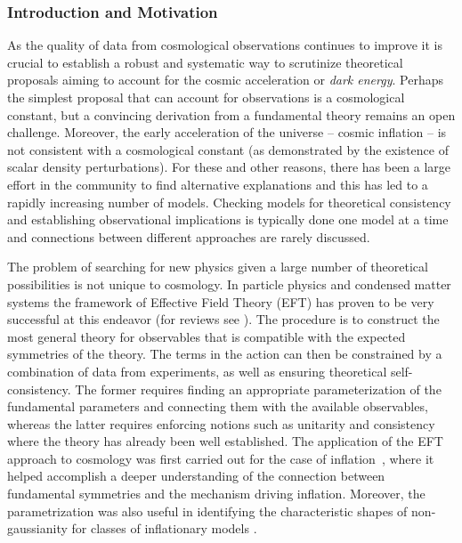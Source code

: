 \documentclass[useAMS,12pt]{article}
\begin{document}
\subsubsection{Introduction and Motivation}

As the quality of data from cosmological observations continues to improve it is crucial to establish a robust and systematic way to scrutinize theoretical proposals aiming to account for the 
cosmic acceleration or {\em dark energy}.  Perhaps the simplest proposal that can account for observations is a cosmological constant, but a convincing derivation from a fundamental theory remains an open challenge.  Moreover, the early acceleration of the universe -- cosmic inflation -- is not consistent with a cosmological constant (as demonstrated by the existence of scalar density perturbations).  For these and other reasons, there has been a large effort in the community to find alternative explanations and this has led to a rapidly increasing number of models.
Checking models for theoretical consistency and establishing observational implications is typically done one model at a time and connections between different approaches are rarely discussed. 

The problem of searching for new physics given a large number of theoretical possibilities is not unique to cosmology.  In particle physics and condensed matter systems the framework of Effective Field Theory (EFT) has proven to be very successful at this endeavor (for reviews see \cite{Kaplan:2005es,Burgess:2007pt}). The procedure is to construct the most general theory for observables that is compatible with the expected symmetries of the theory.  The terms in the action can then be constrained by a combination of data from experiments, as well as ensuring theoretical self-consistency.   The former requires finding an appropriate parameterization of the fundamental parameters and connecting them with the available observables, whereas the latter requires enforcing notions such as unitarity and consistency where the theory has already been well established.
The application of the EFT approach to cosmology was first carried out for the case of inflation~\cite{Cheung:2007st,Weinberg:2008hq,Senatore:2010wk}, where it helped accomplish a 
deeper understanding of the connection between fundamental symmetries and the mechanism driving inflation.  Moreover, the parametrization was also useful in identifying the characteristic shapes of non-gaussianity for classes of inflationary models \cite{Ade:2015ava}.
\\
\end{document}

